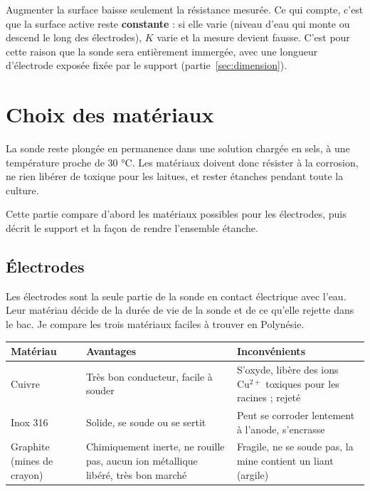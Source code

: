 \documentclass[11pt,a4paper]{article}
\newcommand{\ligne}{\arrayrulecolor{ligneENO}\specialrule{0.4pt}{0pt}{0pt}\arrayrulecolor{black}}
\begin{document}
Augmenter la surface baisse seulement la résistance mesurée. Ce qui compte, c'est que la surface active reste \textbf{constante} : si elle varie (niveau d'eau qui monte ou descend le long des électrodes), $K$ varie et la mesure devient fausse. C'est pour cette raison que la sonde sera entièrement immergée, avec une longueur d'électrode exposée fixée par le support (partie~\ref{sec:dimension}).

\newpage
\section{Choix des matériaux}
\label{sec:materiaux}

La sonde reste plongée en permanence dans une solution chargée en sels, à une température proche de 30 °C. Les matériaux doivent donc résister à la corrosion, ne rien libérer de toxique pour les laitues, et rester étanches pendant toute la culture.

Cette partie compare d'abord les matériaux possibles pour les électrodes, puis décrit le support et la façon de rendre l'ensemble étanche.


\subsection{Électrodes}

Les électrodes sont la seule partie de la sonde en contact électrique avec l'eau. Leur matériau décide de la durée de vie de la sonde et de ce qu'elle rejette dans le bac. Je compare les trois matériaux faciles à trouver en Polynésie.


\begin{center}
\begin{tabularx}{\linewidth}{>{\raggedright\arraybackslash}p{2.6cm} >{\raggedright\arraybackslash}X >{\raggedright\arraybackslash}X}
\toprule
\textbf{Matériau} & \textbf{Avantages} & \textbf{Inconvénients} \\
\midrule
Cuivre & Très bon conducteur, facile à souder & S'oxyde, libère des ions $\mathrm{Cu^{2+}}$ toxiques pour les racines ; rejeté \\ \ligne
Inox 316 & Solide, se soude ou se sertit & Peut se corroder lentement à l'anode, s'encrasse \\ \ligne
Graphite (mines de crayon) & Chimiquement inerte, ne rouille pas, aucun ion métallique libéré, très bon marché & Fragile, ne se soude pas, la mine contient un liant (argile) \\
\bottomrule
\end{tabularx}
\end{center}
\end{document}
